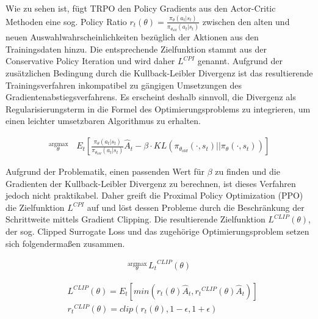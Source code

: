 Wie zu sehen ist, fügt TRPO den Policy Gradients aus den Actor-Critic Methoden eine sog.
Policy Ratio $r_t(\theta) = \frac{\pi_\theta(a_t | s_t)}{\pi_{\theta_{old}}(a_t | s_t)}$
zwischen den alten und neuen Auswahlwahrscheinlichkeiten bezüglich der Aktionen aus
den Trainingsdaten hinzu. Die entsprechende Zielfunktion stammt aus der Conservative Policy
Iteration und wird daher $L^{CPI}$ genannt. Aufgrund der zusätzlichen Bedingung durch die
Kullback-Leibler Divergenz ist das resultierende Trainingsverfahren inkompatibel zu gängigen
Umsetzungen des Gradientenabstiegsverfahrens. Es erscheint deshalb sinnvoll, die Divergenz
als Regularisierungsterm in die Formel des Optimierungsproblems zu integrieren, um einen
leichter umsetzbaren Algorithmus zu erhalten.

\begin{equation}
\begin{aligned}
\stackrel{\text{argmax}}{{}_\theta} \, &E_t\left[ \frac{\pi_\theta(a_t | s_t)}{\pi_{\theta_{old}}(a_t | s_t)}
    \hat{A}_t - \beta \cdot KL(\pi_{\theta_{old}}(\cdot, s_t) || \pi_\theta(\cdot, s_t)) \right]
\end{aligned}
\end{equation}

Aufgrund der Problematik, einen passenden Wert für $\beta$ zu finden und die Gradienten
der Kullback-Leibler Divergenz zu berechnen, ist dieses Verfahren jedoch nicht praktikabel.
Daher greift die Proximal Policy Optimization (PPO) die Zielfunktion $L^{CPI}$ auf und
löst dessen Probleme durch die Beschränkung der Schrittweite mittels Gradient Clipping.
Die resultierende Zielfunktion $L^{CLIP}(\theta)$, der sog. Clipped Surrogate Loss
und das zugehörige Optimierungsproblem setzen sich folgendermaßen zusammen.

\begin{equation}
\begin{aligned}
\stackrel{\text{argmax}}{{}_\theta} \, {L_t}^{CLIP}(\theta)
\end{aligned}
\end{equation}

\begin{equation}
\begin{aligned}
&L^{CLIP}(\theta) = E_t[min(r_t(\theta) \hat{A}_t, {r_t}^{CLIP}(\theta) \hat{A}_t)]\\
&{r_t}^{CLIP}(\theta) = clip(r_t(\theta), 1 - \epsilon , 1 + \epsilon)
\end{aligned}
\end{equation}

